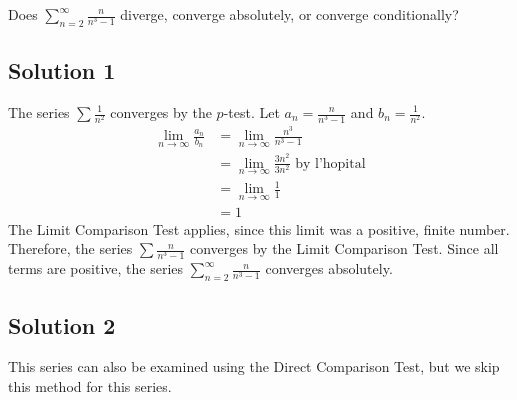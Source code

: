 \documentclass{article}
\begin{document}
\noindent
Does $\displaystyle \sum_{n=2}^\infty \frac{n}{n^3-1}$
diverge, converge absolutely, or converge conditionally?

\subsection*{Solution 1}

The series $\sum \frac1{n^2}$ converges by the $p$-test. Let $a_n = \frac{n}{n^3-1}$ and $b_n = \frac1{n^2}$.
\begin{align*}
\lim_{n \to \infty} \frac{a_n}{b_n}
&= \lim_{n \to \infty} \frac{n^3}{n^3-1}\\
&= \lim_{n \to \infty} \frac{3n^2}{3n^2} \text{ by l'hopital}\\
&= \lim_{n \to \infty} \frac{1}{1}\\
&= 1
\end{align*}
The Limit Comparison Test applies, since this limit was a positive, finite number. Therefore, the series $\sum \frac{n}{n^3-1}$ converges by the Limit Comparison Test.
 Since all terms are positive, the series $\displaystyle \sum_{n=2}^\infty \frac{n}{n^3-1}$ converges absolutely.

\subsection*{Solution 2}

This series can also be examined using the Direct Comparison Test, but we skip this method for this series.
\end{document}
